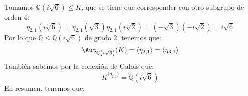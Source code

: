 \begin{ejemplo}
    \noindent
    Tomamos $\mathbb{Q}(i\sqrt{6})\leq K$, que se tiene que corresponder con otro subgrupo de orden 4: 
    \begin{equation*}
        \eta_{2,1}(i\sqrt{6}) = \eta_{2,1}(\sqrt{3})\eta_{2,1}(i\sqrt{2}) = (-\sqrt{3})(-i\sqrt{2}) = i\sqrt{6}
    \end{equation*}
    Por lo que $\mathbb{Q}\leq \mathbb{Q}(i\sqrt{6})$ de grado 2, tenemos que:
    \begin{equation*}
        \Aut_{\mathbb{Q}\left(i\sqrt{6}\right)}(K) = \langle \eta_{2,1} \rangle  = \langle \eta_{3,1} \rangle 
    \end{equation*}
    También sabemos por la conexión de Galois que:
    \begin{equation*}
        K^{\langle \eta_{2,1} \rangle } = \mathbb{Q}(i\sqrt{6})
    \end{equation*}
    En resumen, tenemos que:
    \begin{figure}[H]
        \centering
\end{figure}
\end{ejemplo}
